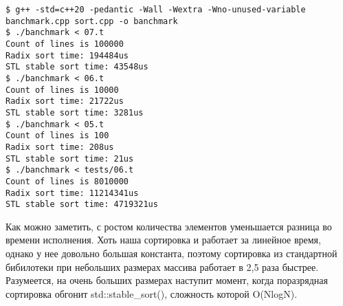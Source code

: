 \begin{lstlisting}
$ g++ -std=c++20 -pedantic -Wall -Wextra -Wno-unused-variable banchmark.cpp sort.cpp -o banchmark
$ ./banchmark < 07.t
Count of lines is 100000
Radix sort time: 194484us
STL stable sort time: 43548us
$ ./banchmark < 06.t
Count of lines is 10000
Radix sort time: 21722us
STL stable sort time: 3281us
$ ./banchmark < 05.t
Count of lines is 100
Radix sort time: 208us
STL stable sort time: 21us
$ ./banchmark < tests/06.t 
Count of lines is 8010000
Radix sort time: 11214341us
STL stable sort time: 4719321us
\end{lstlisting}

Как можно заметить, с ростом количества элементов уменьшается разница во времени исполнения. Хоть наша сортировка и работает за линейное время, однако у нее довольно большая константа, поэтому сортировка из стандартной бибилотеки при небольших размерах массива работает в 2,5 раза быстрее. Разумеется, на очень больших размерах наступит момент, когда поразрядная сортировка обгонит std::stable\_sort(), сложность которой O(NlogN).

\pagebreak

